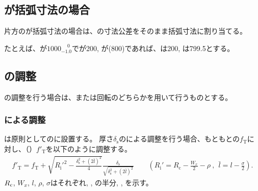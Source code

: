 \subsection{\AlocationLength が括弧寸法の場合}
片方の\AlocationLength が括弧寸法の場合は、\WorkTotalLength の寸法公差をそのまま括弧寸法に割り当てる。
\begin{hosoku}
たとえば、\WorkTotalLength が$1000^{\phantom +0}_{-1.0}$で\TopAlocationLength が200, \BottomAlocationLength が(800)であれば、\TopAlocationLength は200, \BottomAlocationLength は799.5とする。
\end{hosoku}


\subsection{\AlocationLength の調整}
\AlocationLength の調整を行う場合は、\Spacer または\nameTable 回転のどちらかを用いて行うものとする。

\subsubsection{\nameSpacer による調整}
\Spacer は原則として\Jig の\TopSideReceiverPlate に設置する。
厚さ$\delta_\mathrm s$の\nameSpacer による調整を行う場合、もともとの\TopAlocationLength$f_\mathrm T$に対し、\nameTopAlocationLength（\TopReAlocationLength）$f'_\mathrm T$を以下のように調整する。
\begin{align*}
  f'_\mathrm T
  = f_\mathrm T
    +\sqrt{R_\mathrm i'^2-\frac{\delta_\mathrm s^2+(2\bar l)^2}4}\frac{\delta_\mathrm s}{\sqrt{\delta_\mathrm s^2+(2\bar l)^2}}\qquad
    \left(R_\mathrm i' = R_\mathrm c-\frac{W_x}2-\rho~,~~\bar l = l-\frac\sigma2\right).
\end{align*}
$R_\textrm c$, $W_x$, $l$, $\rho$, $\sigma$はそれぞれ\CenterCurvatureRadius, \ACOD, \JigWidth の半分, \ReceiverPlateRadius, \ReceiverPlateWidth を示す。

